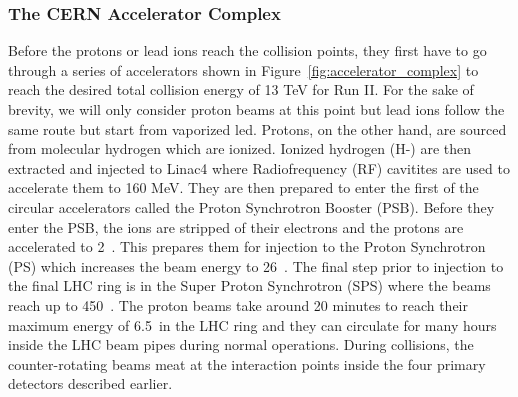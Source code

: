 \subsubsection{The CERN Accelerator Complex}
Before the protons or lead ions reach the collision points, they first have to go through a series of accelerators shown in Figure~\ref{fig:accelerator_complex} to reach the desired total collision energy of 13 TeV for Run II. For the sake of brevity, we will only consider proton beams at this point but lead ions follow the same route but start from vaporized led. Protons, on the other hand, are sourced from molecular hydrogen which are ionized. Ionized hydrogen (H-) are then extracted and injected to Linac4 where Radiofrequency (RF) cavitites are used to accelerate them to 160 MeV. They are then prepared to enter the first of the circular accelerators called the Proton Synchrotron Booster (PSB). Before they enter the PSB, the ions are stripped of their electrons and the protons are accelerated to 2~\GeV. This prepares them for injection to the Proton Synchrotron (PS) which increases the beam energy to 26~\GeV. The final step prior to injection to the final LHC ring is in the Super Proton Synchrotron (SPS) where the beams reach up to 450~\GeV.
The proton beams take around 20 minutes to reach their maximum energy of 6.5~\TeV in the LHC ring and they can circulate for many hours inside the LHC beam pipes during normal operations. During collisions, the counter-rotating beams meat at the interaction points inside the four primary detectors described earlier.




